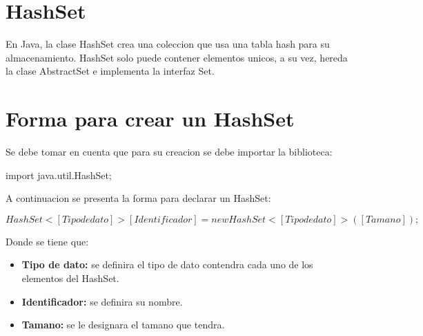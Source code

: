 \documentclass[12pt, letterpaper]{article} %
\begin{document}
\section*{HashSet}
En Java, la clase HashSet crea una coleccion que usa una tabla hash para su almacenamiento. HashSet solo puede contener elementos unicos, a su vez, hereda la clase AbstractSet e implementa la interfaz Set.

\section*{Forma para crear un HashSet}
Se debe tomar en cuenta que para su creacion se debe importar la biblioteca:
\begin{center}
    import java.util.HashSet;
\end{center}
A continuacion se presenta la forma para declarar un HashSet:
\begin{center}
   $HashSet<[Tipo de dato]> [Identificador] = new HashSet<[Tipo de dato]>([Tamano]);$ 
\end{center}
Donde se tiene que:
\begin{itemize}
    \item \textbf{Tipo de dato:} se definira el tipo de dato contendra cada uno de los elementos del HashSet.
    \item \textbf{Identificador:} se definira su nombre.
    \item \textbf{Tamano:} se le designara el tamano que tendra.
\end{itemize}
\end{document}

